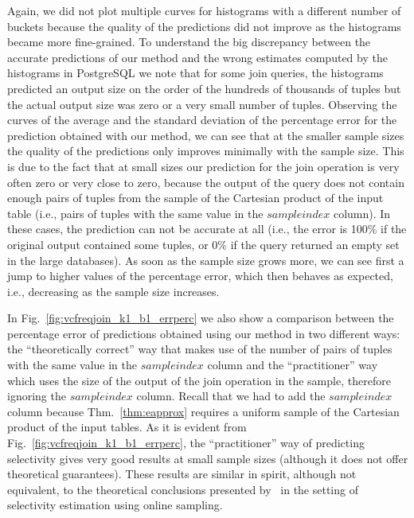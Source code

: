 Again,
we did not plot multiple curves for histograms with a different number of
buckets because the quality of the predictions did not improve as the histograms
became more fine-grained. To understand the big discrepancy between the accurate
predictions of our method and the wrong estimates computed by the histograms in
PostgreSQL  we note that  for some join queries, the
histograms predicted an output size on the order of the hundreds of thousands of
tuples but the actual output size was zero or a very small number of tuples.
Observing the curves of
the average and the standard deviation of the percentage error for the
prediction obtained with our method, we can see that at the smaller sample sizes
the quality of the predictions only improves minimally with the sample size.
This is due to the fact that at small sizes our prediction for the join
operation is very often zero or very close to zero, because the output of the
query does not contain enough pairs of tuples from the sample of the Cartesian
product of the input table (i.e., pairs of tuples with the same value in the
$sampleindex$ column). In these cases, the prediction can not be accurate at all
(i.e., the error is 100\% if the original output contained some tuples, or 0\% if
the query returned an empty set in the large databases). As soon as the sample
size grows more, we can see first a jump to higher values of the percentage
error, which then behaves as expected, i.e., decreasing as the sample size
increases. 

In Fig.~\ref{fig:vcfreqjoin_k1_b1_errperc} we also show a
comparison between the percentage error of predictions obtained using our method
in two different ways: the ``theoretically correct'' way that makes use of the
number of pairs of tuples with the same value in the $sampleindex$ column and
the ``practitioner'' way which uses the size of the output of the join operation
in the sample, therefore ignoring the $sampleindex$ column. Recall that we had
to add the $sampleindex$ column because Thm.~\ref{thm:eapprox} requires a
uniform sample of the Cartesian product of the input tables.
As it is evident from Fig.~\ref{fig:vcfreqjoin_k1_b1_errperc}, the ``practitioner''
way of predicting selectivity gives very good results at small sample sizes
(although it does not offer theoretical guarantees). These results are similar
in spirit, although not equivalent, to the theoretical conclusions presented
by~\citet{HaasNSS96} in the setting of selectivity estimation
using online sampling.

